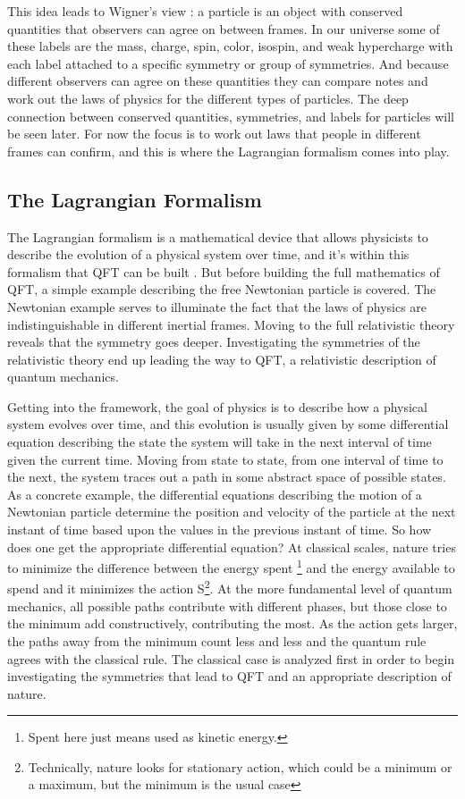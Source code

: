 \documentclass[12pt]{article}
\begin{document}
This idea leads to Wigner's view \cite{wigner}: a particle is an object with conserved quantities that observers can agree on between frames. In our universe some of these labels are the mass, charge, spin, color, isospin, and weak hypercharge with each label attached to a specific symmetry or group of symmetries. And because different observers can agree on these quantities they can compare notes and work out the laws of physics for the different types of particles. The deep connection between conserved quantities, symmetries, and labels for particles will be seen later. For now the focus is to work out laws that people in different frames can confirm, and this is where the Lagrangian formalism comes into play. 

\subsection{The Lagrangian Formalism}

The Lagrangian formalism is a mathematical device that allows physicists to describe the evolution of a physical system over time, and it's within this formalism that QFT can be built \cite{peskin,qftam}. But before building the full mathematics of QFT, a simple example describing the free Newtonian particle is covered. The Newtonian example serves to illuminate the fact that the laws of physics are indistinguishable in different inertial frames. Moving to the full relativistic theory reveals that the symmetry goes deeper. Investigating the symmetries of the relativistic theory end up leading the way to QFT, a relativistic description of quantum mechanics.

Getting into the framework, the goal of physics is to describe how a physical system evolves over time, and this evolution is usually given by some differential equation describing the state the system will take in the next interval of time given the current time. Moving from state to state, from one interval of time to the next, the system traces out a path in some abstract space of possible states. As a concrete example, the differential equations describing the motion of a Newtonian particle determine the position and velocity of the particle at the next instant of time based upon the values in the previous instant of time. So how does one get the appropriate differential equation? At classical scales, nature tries to minimize the difference between the energy spent \footnote{Spent here just means used as kinetic energy.} and the energy available to spend and it minimizes the action S\footnote{Technically, nature looks for stationary action, which could be a minimum or a maximum, but the minimum is the usual case}. At the more fundamental level of quantum mechanics, all possible paths contribute with different phases, but those close to the minimum add constructively, contributing the most. As the action gets larger, the paths away from the minimum count less and less and the quantum rule agrees with the classical rule. The classical case is analyzed first in order to begin investigating the symmetries that lead to QFT and an appropriate description of nature. 
\end{document}

